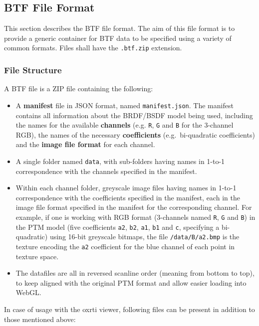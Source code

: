 \hypertarget{btf-file-format}{%
\subsection{BTF File Format}\label{sec_btf-file-format}}

This section describes the BTF file format. The aim of this file format
is to provide a generic container for BTF data to be specified using a
variety of common formats. Files shall have the \texttt{.btf.zip}
extension.

\hypertarget{file-structure}{%
\subsubsection{File Structure}\label{file-structure}}

A BTF file is a ZIP file containing the following:
\begin{itemize}
\item A \textbf{manifest}
file in JSON format, named \texttt{manifest.json}. The manifest contains
all information about the BRDF/BSDF model being used, including the
names for the available \textbf{channels} (e.g. \texttt{R}, \texttt{G}
and \texttt{B} for the 3-channel RGB), the names of the necessary
\textbf{coefficients} (e.g.~bi-quadratic coefficients) and the
\textbf{image file format} for each channel.
\item A single folder named
\texttt{data}, with sub-folders having names in 1-to-1 correspondence
with the channels specified in the manifest.
\item Within each channel
folder, greyscale image files having names in 1-to-1 correspondence with
the coefficients specified in the manifest, each in the image file
format specified in the manifest for the corresponding channel. For
example, if one is working with RGB format (3-channels named \texttt{R},
\texttt{G} and \texttt{B}) in the PTM model (five coefficients
\texttt{a2}, \texttt{b2}, \texttt{a1}, \texttt{b1} and \texttt{c},\!
specifying a bi-quadratic) using 16-bit greyscale bitmaps, the file
\texttt{/data/B/a2.bmp} is the texture encoding the \texttt{a2}
coefficient for the blue channel of each point in texture space.
\item The
datafiles are all in reversed scanline order (meaning from bottom to
top), to keep aligned with the original PTM format and allow easier
loading into WebGL.
\end{itemize}

In case of usage with the oxrti viewer, following files can be present in
addition to those mentioned above:

